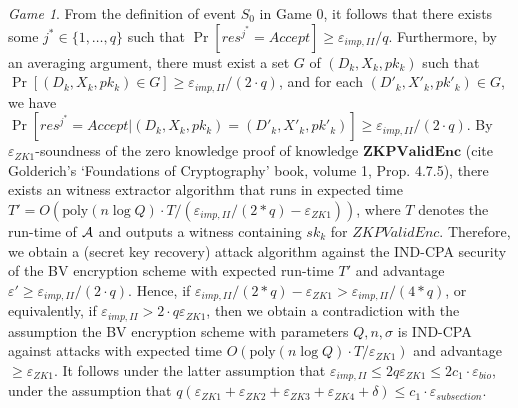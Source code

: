 \textit{Game 1}. From the definition of event $S_0$ in Game 0, it follows that there exists some $j^* \in \{1,\ldots,q\}$ such that $\Pr[res^{j^*} = Accept] \geq \varepsilon_{imp,II}/q$. Furthermore, by an averaging argument, there must exist a set $G$ of $(D_k,X_k,pk_k)$ such that $\Pr[(D_k,X_k,pk_k) \in G] \geq \varepsilon_{imp,II}/(2 \cdot q)$, and for each $(D'_k,X'_k,pk'_k) \in G$, we have $\Pr[res^{j^*} = Accept |(D_k,X_k,pk_k)=(D'_k,X'_k,pk'_k)] \geq  \varepsilon_{imp,II}/(2 \cdot q)$. By $\varepsilon_{ZK1}$-soundness of the zero knowledge proof of knowledge $\mathbf{ZKPValidEnc}$ (cite Golderich's `Foundations of Cryptography' book, volume 1, Prop. 4.7.5), there exists an witness extractor algorithm that runs in expected time $T'=O(\mathrm{poly}(n \log Q) \cdot T / (\varepsilon_{imp,II}/(2*q) - \varepsilon_{ZK1}))$, where $T$ denotes the run-time of $\mathcal{A}$ and outputs a witness containing $sk_k$ for ${ZKPValidEnc}$. Therefore, we obtain a (secret key recovery) attack algorithm against the IND-CPA security of the BV encryption scheme with expected run-time $T'$ and advantage $\varepsilon' \geq \varepsilon_{imp,II}/(2 \cdot q)$. Hence,  if $\varepsilon_{imp,II}/(2*q) - \varepsilon_{ZK1} > \varepsilon_{imp,II}/(4*q)$, or equivalently, if $\varepsilon_{imp,II} > 2 \cdot q \varepsilon_{ZK1}$, then we obtain a contradiction with the assumption the BV encryption scheme with parameters $Q,n,\sigma$ is IND-CPA against attacks with expected time $O(\mathrm{poly}(n \log Q) \cdot T / \varepsilon_{ZK1})$ and advantage $\geq \varepsilon_{ZK1}$. It follows under the latter assumption that $\varepsilon_{imp,II} \leq 2q \varepsilon_{ZK1} \leq 2 c_1  \cdot \varepsilon_{bio}$, under the assumption that  $q(\varepsilon_{ZK1}+\varepsilon_{ZK2} +
\varepsilon_{ZK3} + \varepsilon_{ZK4} + \delta) \leq c_1 \cdot \varepsilon_{subsection}$.


